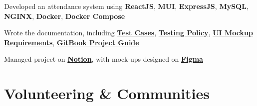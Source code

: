\documentclass[]{openfont}
\begin{document}
\begin{minipage}[t]{0.65\textwidth}
\begin{tightemize}
    \item Developed an attendance system using \textbf{ReactJS}, \textbf{MUI}, \textbf{ExpressJS}, \textbf{MySQL}, \textbf{NGINX}, \textbf{Docker}, \textbf{Docker Compose}
    \item Wrote the documentation, including \textbf{\href{https://docs.google.com/spreadsheets/d/1IoFYTfmonSmj8XrJVA4r6KDa8BZbtHO_/edit?usp=sharing&ouid=106105819354897704806&rtpof=true&sd=true}{Test Cases}}, \textbf{\href{https://github.com/Rubix982/Reflex/blob/main/docs/pdfs/Testing\%20Policy.pdf}{Testing Policy}}, \textbf{\href{https://github.com/Rubix982/Reflex/blob/main/docs/pdfs/UI\%20Mockups.pdf}{UI Mockup Requirements}}, \textbf{\href{https://k180307.gitbook.io/reflex/}{GitBook Project Guide}}
    \item Managed project on \textbf{\href{https://www.notion.so/Reflex-bfe33ff4e9984072aeac514fe6d6bb30}{Notion}}, with mock-ups designed on \textbf{\href{https://www.figma.com/file/PKzIocgkOTkDdy2mtKyk9c/Reflex?node-id=0\%3A1}{Figma}}
\end{tightemize} 


\section{Volunteering \& Communities}
\textbullet{} 

\textbullet{} 

\textbullet{} 

\textbullet{} 
\sectionsep

\end{minipage} 
\end{document}
